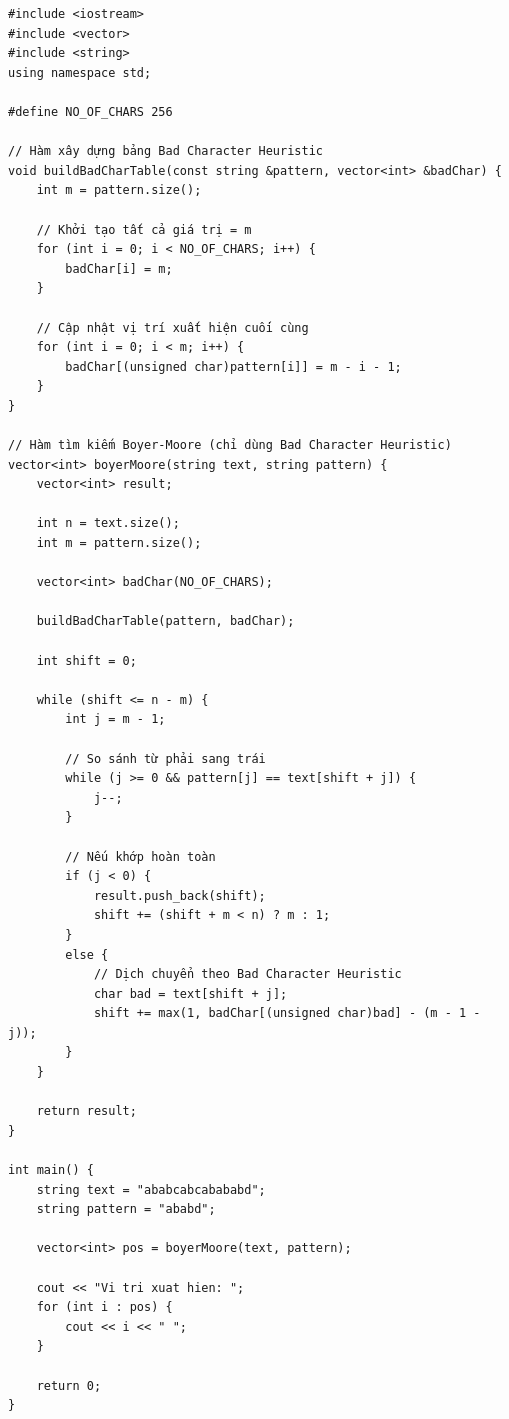 \begin{verbatim}
#include <iostream>
#include <vector>
#include <string>
using namespace std;

#define NO_OF_CHARS 256

// Hàm xây dựng bảng Bad Character Heuristic
void buildBadCharTable(const string &pattern, vector<int> &badChar) {
    int m = pattern.size();

    // Khởi tạo tất cả giá trị = m
    for (int i = 0; i < NO_OF_CHARS; i++) {
        badChar[i] = m;
    }

    // Cập nhật vị trí xuất hiện cuối cùng
    for (int i = 0; i < m; i++) {
        badChar[(unsigned char)pattern[i]] = m - i - 1;
    }
}

// Hàm tìm kiếm Boyer-Moore (chỉ dùng Bad Character Heuristic)
vector<int> boyerMoore(string text, string pattern) {
    vector<int> result;

    int n = text.size();
    int m = pattern.size();

    vector<int> badChar(NO_OF_CHARS);

    buildBadCharTable(pattern, badChar);

    int shift = 0;

    while (shift <= n - m) {
        int j = m - 1;

        // So sánh từ phải sang trái
        while (j >= 0 && pattern[j] == text[shift + j]) {
            j--;
        }

        // Nếu khớp hoàn toàn
        if (j < 0) {
            result.push_back(shift);
            shift += (shift + m < n) ? m : 1;
        }
        else {
            // Dịch chuyển theo Bad Character Heuristic
            char bad = text[shift + j];
            shift += max(1, badChar[(unsigned char)bad] - (m - 1 - j));
        }
    }

    return result;
}

int main() {
    string text = "ababcabcabababd";
    string pattern = "ababd";

    vector<int> pos = boyerMoore(text, pattern);

    cout << "Vi tri xuat hien: ";
    for (int i : pos) {
        cout << i << " ";
    }

    return 0;
}
\end{verbatim}